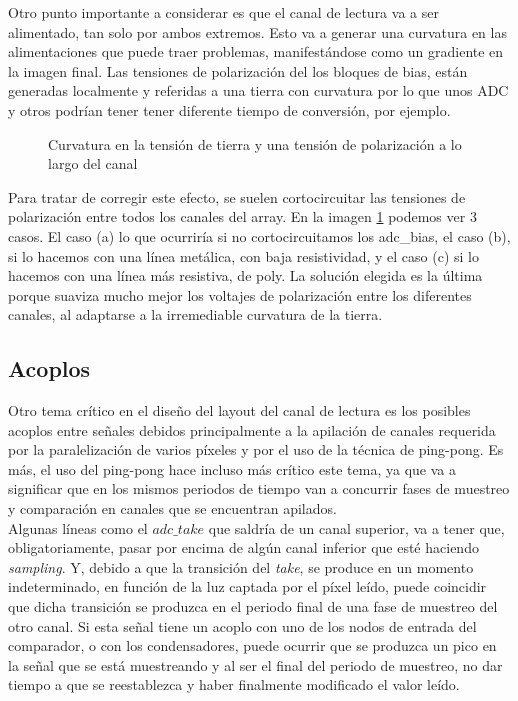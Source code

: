 Otro punto importante a considerar es que el canal de lectura va a ser alimentado,
tan solo por ambos extremos. Esto va a generar una curvatura en las alimentaciones
que puede traer problemas, manifestándose como un gradiente en la imagen final.
Las tensiones de polarización del los bloques de bias, están generadas localmente
y referidas a una tierra con curvatura por lo que unos ADC y otros
podrían tener tener diferente tiempo de conversión, por ejemplo.\\

\begin{figure}[ht]
	
	\caption{Curvatura en la tensión de tierra y una tensión de polarización a lo largo del canal}
	\label{fig:adc_poly_short}
\end{figure}

Para tratar de corregir este efecto, se suelen cortocircuitar las tensiones de polarización
entre todos los canales del array. En la imagen \ref{fig:adc_poly_short} podemos ver
3 casos. El caso (a) lo que ocurriría si no cortocircuitamos los adc\_bias,
el caso (b), si lo hacemos con una línea metálica, con baja resistividad,
y el caso (c) si lo hacemos con una línea más resistiva, de poly.
La solución elegida es la última porque suaviza mucho mejor los voltajes de polarización
entre los diferentes canales, al adaptarse a la irremediable curvatura de la tierra.\\

\subsection{Acoplos}

Otro tema crítico en el diseño del layout del canal de lectura es los posibles acoplos
entre señales debidos principalmente a la apilación de canales requerida por la
paralelización de varios píxeles y por el uso de la técnica de ping-pong. Es más,
el uso del ping-pong hace incluso más crítico este tema, ya que va a significar
que en los mismos periodos de tiempo van a concurrir fases de muestreo y comparación
en canales que se encuentran apilados.\\

Algunas líneas como el $adc\_take$ que saldría de un canal superior, va a tener que,
obligatoriamente, pasar por encima de algún canal inferior que esté haciendo
\textit{sampling}. Y, debido a que la transición del \textit{take}, se produce
en un momento indeterminado, en función de la luz captada por el píxel leído, puede
coincidir que dicha transición se produzca en el periodo final de una fase de
muestreo del otro canal. Si esta señal tiene un acoplo con uno de los nodos de
entrada del comparador, o con los condensadores, puede ocurrir que se produzca
un pico en la señal que se está muestreando y al ser el final del periodo de muestreo,
no dar tiempo a que se reestablezca y haber finalmente modificado el valor leído.\\

